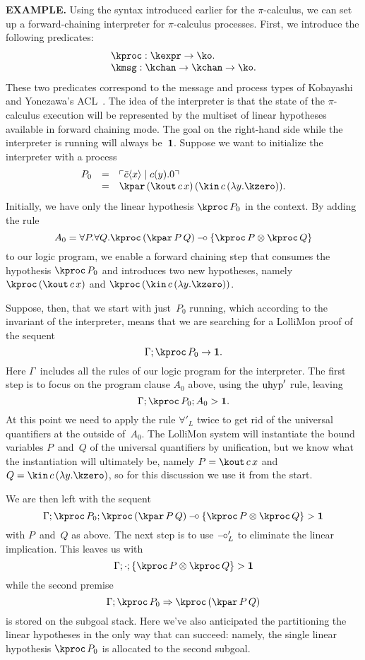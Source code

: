 \documentclass{sig-alt}
\begin{document}
\textbf{EXAMPLE.}\enspace 
Using the syntax introduced earlier for the $\pi$-calculus, we can set
up a forward-chaining interpreter for $\pi$-calculus processes.
First, we introduce the following predicates:
$$
\begin{array}{l}
\kproc : \kexpr \to \ko. \\
\kmsg : \kchan \to \kchan \to \ko. \\
\end{array}
$$
These two predicates correspond to the message and process types of
Kobayashi and Yonezawa's ACL~\cite{Kobayashi94tr}.
The idea of the interpreter is that the state of the $\pi$-calculus
execution will be represented by the multiset of linear hypotheses
available in forward chaining mode.
The goal on the right-hand side while the interpreter is running will
always be~$\textbf{1}$.
Suppose we want to initialize
the interpreter with a process
$$
\begin{array}{rll}
  P_0 &=& \rep{\pout{c}{x} \mid \pin{c}{y}.0} \\
      &=& \kpar\,(\kout\,c\,x)\,(\kin\,c\,(\lambda y.\kzero)). \\
\end{array}
$$
Initially, we have only the linear hypothesis $\kproc\,P_0$ in
the context.  By adding the rule
$$
  A_0 = \forall P.\forall Q.\kproc\,(\kpar\,P\,Q) \limp \{\kproc\,P \tensor \kproc\,Q\}
$$
to our logic program, we enable a forward chaining step that consumes
the hypothesis $\kproc\,P_0$ and introduces two new hypotheses, namely
$\kproc\,(\kout\,c\,x)$ and $\kproc\,(\kin\,c\,(\lambda y.\kzero))$.

Suppose, then, that we start with just~$P_0$ running, which according
to the invariant of the interpreter, means that we are searching for
a LolliMon proof of the sequent
$$
  \CLFLseq{\Gamma}{\kproc\,P_0}{\one}.
$$
Here $\Gamma$~includes all the rules of our logic program for the
interpreter.
The first step is to focus on the program clause $A_0$ above,
using the $\hbox{uhyp}'$ rule, leaving
$$
  \CLFLLFseq{\Gamma}{\kproc\,P_0}{A_0}{\one}.
$$
At this point we need to apply the rule $\forall'_L$ twice to get
rid of the universal quantifiers at the outside of~$A_0$.  The LolliMon
system will instantiate the bound variables $P$~and~$Q$ of the universal
quantifiers by unification, but we know what the
instantiation will ultimately be, namely $P=\kout\,c\,x$ and
$Q=\kin\,c\,(\lambda y.\kzero)$, so for this discussion we use it from the start.

We are then left with the sequent
$$
  \CLFLLFseq{\Gamma}{\kproc\,P_0}{\kproc\,(\kpar\,P\,Q)
    \limp \{\kproc\,P \tensor \kproc\,Q\}}{\one}
$$
with $P$~and~$Q$ as above. The next step is to use $\mathbin{-\hspace{-0.70mm}\circ}'_L$ to
eliminate the linear implication.  This leaves us with
$$
  \CLFLLFseq{\Gamma}{\cdot}{\{\kproc\,P \tensor \kproc\,Q\}}{\one}\\
$$ 
%
while the second premise
$$
  \CLFRIseq{\Gamma}{\kproc\,P_0}{\kproc\,(\kpar\,P\,Q)}
$$
%
is stored on the subgoal stack.  Here we've also anticipated the
partitioning the linear hypotheses in the only way that
can succeed: namely, the single linear hypothesis $\kproc\,P_0$ is
allocated to the second subgoal.
\end{document}
